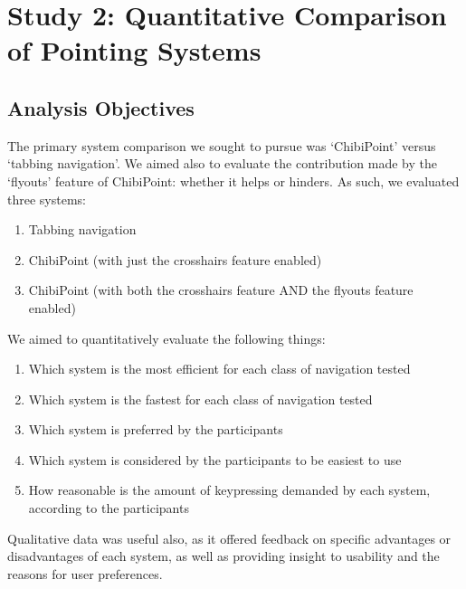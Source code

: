 \documentclass[11pt,openright,a4paper]{report}
\begin{document}
\section{Study 2: Quantitative Comparison of Pointing Systems}
\subsection{Analysis Objectives}
\label{sec:systemcomparisonobjectives}
The primary system comparison we sought to pursue was `ChibiPoint' versus `tabbing navigation'. We aimed also to evaluate the contribution made by the `flyouts' feature of ChibiPoint: whether it helps or hinders. As such, we evaluated three systems:
\begin{enumerate}
\item Tabbing navigation
\item ChibiPoint (with just the crosshairs feature enabled)
\item ChibiPoint (with both the crosshairs feature AND the flyouts feature enabled)
\end{enumerate}

We aimed to quantitatively evaluate the following things:
\begin{enumerate}
\item Which system is the most efficient for each class of navigation tested
\item Which system is the fastest for each class of navigation tested
\item Which system is preferred by the participants
\item Which system is considered by the participants to be easiest to use
\item How reasonable is the amount of keypressing demanded by each system, according to the participants
\end{enumerate}

Qualitative data was useful also, as it offered feedback on specific advantages or disadvantages of each system, as well as providing insight to usability and the reasons for user preferences.
\end{document}

